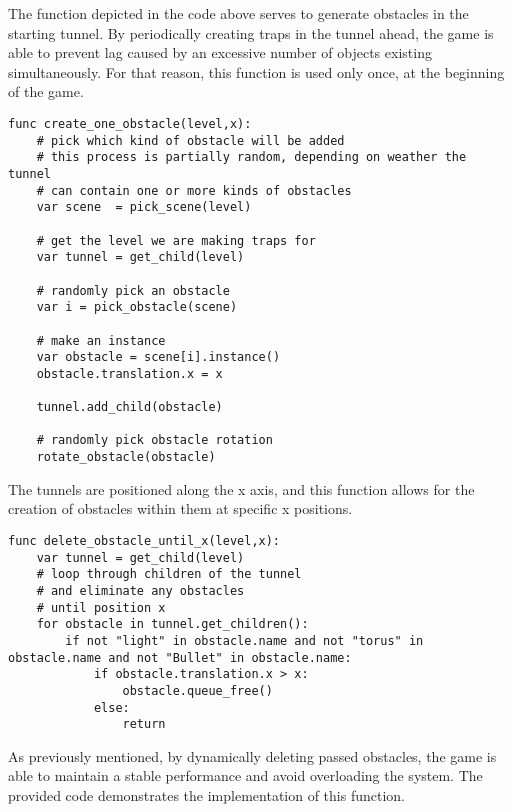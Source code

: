 The function depicted in the code above serves to generate obstacles in the starting tunnel. By periodically creating traps in the tunnel ahead, the game is able to prevent lag caused by an excessive number of objects existing simultaneously. For that reason, this function is used only once, at the beginning of the game.

\begin{lstlisting} 
func create_one_obstacle(level,x):
    # pick which kind of obstacle will be added
    # this process is partially random, depending on weather the tunnel 
    # can contain one or more kinds of obstacles
    var scene  = pick_scene(level)   
    
    # get the level we are making traps for
    var tunnel = get_child(level)
    
    # randomly pick an obstacle
    var i = pick_obstacle(scene)
    
    # make an instance
    var obstacle = scene[i].instance()
    obstacle.translation.x = x
    
    tunnel.add_child(obstacle)
    
    # randomly pick obstacle rotation
    rotate_obstacle(obstacle)
\end{lstlisting}

The tunnels are positioned along the x axis, and this function allows for the creation of obstacles within them at specific x positions.

\begin{lstlisting}           
func delete_obstacle_until_x(level,x):
    var tunnel = get_child(level)
    # loop through children of the tunnel
    # and eliminate any obstacles
    # until position x
    for obstacle in tunnel.get_children():
        if not "light" in obstacle.name and not "torus" in obstacle.name and not "Bullet" in obstacle.name:
            if obstacle.translation.x > x:
                obstacle.queue_free()
            else:
                return
\end{lstlisting}

As previously mentioned, by dynamically deleting passed obstacles, the game is able to maintain a stable performance and avoid overloading the system. The provided code demonstrates the implementation of this function.
